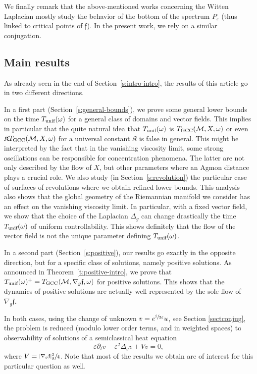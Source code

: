 \documentclass[JEP,XML,SOM,Unicode]{cedram}
\newcommand{\GCC}{\textup{GCC}}
\newcommand{\unif}{\textup{unif}}
\theoremstyle{definition}
\newcommand{\M}{\ensuremath{\mathcal M}}
\newcommand{\f}{\ensuremath{\mathfrak{f}}}
\newcommand\Lap{\Delta_{g}}
\newcommand\nablag{\nabla_{g}}
\let\e\varepsilon
\let\eps\varepsilon
\begin{document}
We finally remark that the above-mentioned works concerning the Witten Laplacian mostly study the behavior of the bottom of the spectrum $P_\eps$ (thus linked to critical points of $\f$).
In the present work, we rely on a similar conjugation.

\subsection{Main results}
\label{s:main-res}
As already seen in the end of Section~\ref{s:intro-intro}, the results of this article go in two different directions.

In a first part (Section~\ref{s:general-bounds}), we prove some general lower bounds on the time $T_{\unif}(\omega)$ for a general class of domains and vector fields. This implies in particular that the quite natural idea that $T_{\unif}(\omega)$ is $T_{\GCC}(\M,X,\omega)$ or even $\mathfrak{K}T_{\GCC}(\M,X,\omega)$ for a universal constant $\mathfrak{K}$ is false in general. This might be interpreted by the fact that in the vanishing viscosity limit, some strong oscillations can be responsible for concentration phenomena. The latter are not only described by the flow of $X$, but other parameters where an Agmon distance plays a crucial role. We also study (in Section~\ref{s:revolution}) the particular case of surfaces of revolutions where we obtain refined lower bounds. This analysis also shows that the global geometry of the Riemannian manifold we consider has an effect on the vanishing viscosity limit. In particular, with a fixed vector field, we show that the choice of the Laplacian $\Lap$ can change drastically the time $T_{\unif}(\omega)$ of uniform controllability. This shows definitely that the flow of the vector field is not the unique parameter defining $T_{\unif}(\omega)$.

In a second part (Section~\ref{s:positive}), our results go exactly in the opposite direction, but for a specific class of solutions, namely positive solutions. As announced in Theorem~\ref{t:positive-intro}, we prove that $T_{\unif}(\omega)^+=T_{\GCC}(\M,\nabla_g\f,\omega)$ for positive solutions.
This shows that the dynamics of positive solutions are actually well represented by the sole flow of~$\nabla_g\f$.

In both cases, using the change of unknown $v= e^{\sfrac{\f}{2\eps}} u$, see Section \ref{sectconjug}, the problem is reduced (modulo lower order terms, and in weighted spaces) to observability of solutions of a semiclassical heat equation
\[
\e\partial_t v- \eps^2 \Lap v+Vv =0,
\]
where $V= \sfrac{|\nablag \f|_g^2}{4}$. Note that most of the results we obtain are of interest for this particular question as well.
\end{document}

